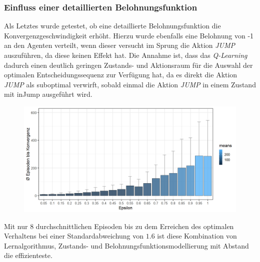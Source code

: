 \subsubsection*{Einfluss einer detaillierten Belohnungsfunktion}
Als Letztes wurde getestet, ob eine detaillierte Belohnungsfunktion die Konvergenzgeschwindigkeit erhöht. Hierzu wurde ebenfalls eine Belohnung von -1 an den Agenten verteilt, wenn dieser versucht im Sprung die Aktion \textit{JUMP} auszuführen, da diese keinen Effekt hat. Die Annahme ist, dass das \textit{Q-Learning} dadurch einen deutlich geringen Zustands- und Aktionsraum für die Auswahl der optimalen Entscheidungssequenz zur Verfügung hat, da es direkt  die Aktion \textit{JUMP} als suboptimal verwirft, sobald einmal die Aktion \textit{JUMP} in einem Zustand mit \glqq inJump\grqq{} ausgeführt wird. 
\begin{figure}[H]
    \centering
    \includegraphics[width=\textwidth]{images/SimpleZ2B4QLearningA}
    \label{fig:test1}
\end{figure}
Mit nur 8 durchschnittlichen Episoden bis zu dem Erreichen des optimalen Verhaltens bei einer Standardabweichung von $1.6$ ist diese Kombination von Lernalgorithmus, Zustands- und Belohnungsfunktionsmodellierung mit Abstand die effizienteste.

